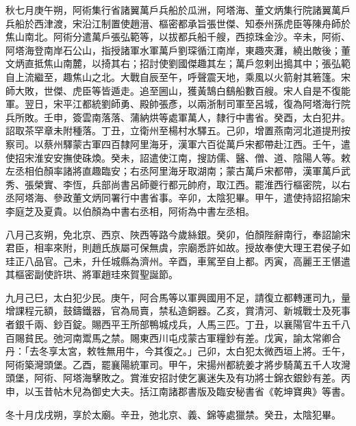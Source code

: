 \begin{pinyinscope}
 秋七月庚午朔，阿術集行省諸翼萬戶兵船於瓜洲，阿塔海、董文炳集行院諸翼萬戶兵船於西津渡，宋沿江制置使趙溍、樞密都承旨張世傑、知泰州孫虎臣等陳舟師於焦山南北。阿術分遣萬戶張弘範等，以拔都兵船千艘，西掠珠金沙。辛未，阿術、阿塔海登南岸石公山，指授諸軍水軍萬戶劉琛循江南岸，東趣夾灘，繞出敵後；董文炳直抵焦山南麓，以掎其右；招討使劉國傑趣其左；萬戶忽剌出搗其中；張弘範自上流繼至，趣焦山之北。大戰自辰至午，呼聲震天地，乘風以火箭射其箬篷。宋師大敗，世傑、虎臣等皆遁走。追至圌山，獲黃鵠白鷂船數百艘。宋人自是不復能軍。翌日，宋平江都統劉師勇、殿帥張彥，以兩浙制司軍至呂城，復為阿塔海行院兵所敗。壬申，簽雲南落落、蒲納烘等處軍萬人，隸行中書省。癸酉，太白犯井。詔取茶罕章未附種落。丁丑，立衛州至楊村水驛五。己卯，增置燕南河北道提刑按察司。以蔡州驛蒙古軍四百隸阿里海牙，漢軍六百從萬戶宋都帶赴江西。壬午，遣使招宋淮安安撫使硃煥。癸未，詔遣使江南，搜訪儒、醫、僧、道、陰陽人等。敕左丞相伯顏率諸將直趣臨安；右丞阿里海牙取湖南；蒙古萬戶宋都帶，漢軍萬戶武秀、張榮實、李恆，兵部尚書呂師夔行都元帥府，取江西。罷淮西行樞密院，以右丞阿塔海、參政董文炳同署行中書省事。辛卯，太陰犯畢。甲午，遣使持詔招諭宋李庭芝及夏貴。以伯顏為中書右丞相，阿術為中書左丞相。



 八月己亥朔，免北京、西京、陜西等路今歲絲銀。癸卯，伯顏陛辭南行，奉詔諭宋君臣，相率來附，則趙氏族屬可保無虞，宗廟悉許如故。授故奉使大理王君侯子如珪正八品官。己未，升任城縣為濟州。辛酉，車駕至自上都。丙寅，高麗王王愖遣其樞密副使許珙、將軍趙珪來賀聖誕節。



 九月己巳，太白犯少民。庚午，阿合馬等以軍興國用不足，請復立都轉運司九，量增課程元額，鼓鑄鐵器，官為局賣，禁私造銅器。乙亥，賞清河、新城戰士及死事者銀千兩、鈔百錠。賜西平王所部鴨城戍兵，人馬三匹。丁丑，以襄陽官牛五千八百賜貧民。弛河南鬻馬之禁。賜東西川屯戍蒙古軍糧鈔有差。戊寅，諭太常卿合丹：「去冬享太宮，敕牲無用牛，今其復之。」己卯，太白犯太微西垣上將。壬午，阿術築灣頭堡。乙酉，罷襄陽統軍司。甲午，宋揚州都統姜才將步騎萬五千人攻灣頭堡，阿術、阿塔海擊敗之。賞淮安招討使乞裏迷失及有功將士錦衣銀鈔有差。丙申，以玉昔帖木兒為御史大夫。括江南諸郡書版及臨安秘書省《乾坤寶典》等書。



 冬十月戊戌朔，享於太廟。辛丑，弛北京、義、錦等處獵禁。癸丑，太陰犯畢。




\end{pinyinscope}
